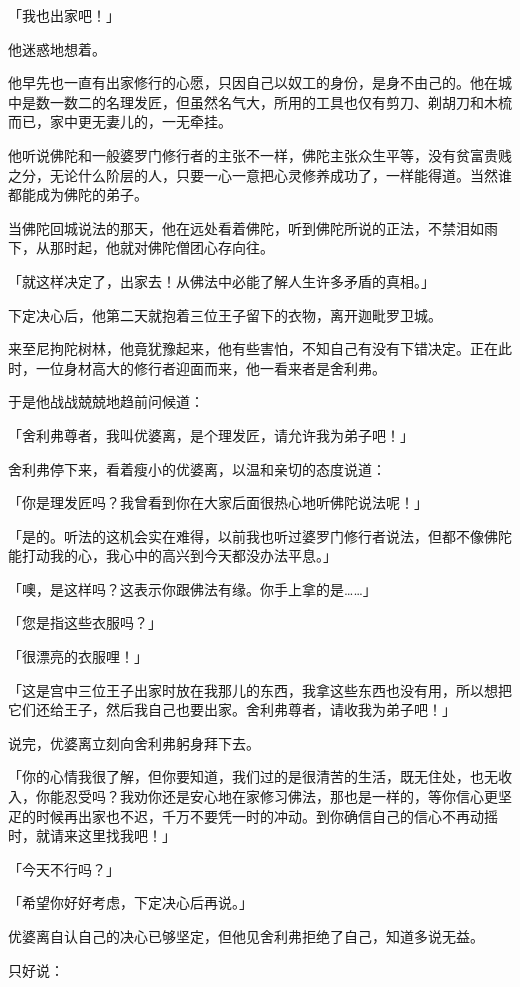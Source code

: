 \documentclass[twoside,openany]{book}
\begin{document}
「我也出家吧！」

他迷惑地想着。

他早先也一直有出家修行的心愿，只因自己以奴工的身份，是身不由己的。他在城中是数一数二的名理发匠，但虽然名气大，所用的工具也仅有剪刀、剃胡刀和木梳而已，家中更无妻儿的，一无牵挂。

他听说佛陀和一般婆罗门修行者的主张不一样，佛陀主张众生平等，没有贫富贵贱之分，无论什么阶层的人，只要一心一意把心灵修养成功了，一样能得道。当然谁都能成为佛陀的弟子。

当佛陀回城说法的那天，他在远处看着佛陀，听到佛陀所说的正法，不禁泪如雨下，从那时起，他就对佛陀僧团心存向往。

「就这样决定了，出家去！从佛法中必能了解人生许多矛盾的真相。」

下定决心后，他第二天就抱着三位王子留下的衣物，离开迦毗罗卫城。

来至尼拘陀树林，他竟犹豫起来，他有些害怕，不知自己有没有下错决定。正在此时，一位身材高大的修行者迎面而来，他一看来者是舍利弗。

于是他战战兢兢地趋前问候道：

「舍利弗尊者，我叫优婆离，是个理发匠，请允许我为弟子吧！」

舍利弗停下来，看着瘦小的优婆离，以温和亲切的态度说道：

「你是理发匠吗？我曾看到你在大家后面很热心地听佛陀说法呢！」

「是的。听法的这机会实在难得，以前我也听过婆罗门修行者说法，但都不像佛陀能打动我的心，我心中的高兴到今天都没办法平息。」

「噢，是这样吗？这表示你跟佛法有缘。你手上拿的是……」

「您是指这些衣服吗？」

「很漂亮的衣服哩！」

「这是宫中三位王子出家时放在我那儿的东西，我拿这些东西也没有用，所以想把它们还给王子，然后我自己也要出家。舍利弗尊者，请收我为弟子吧！」

说完，优婆离立刻向舍利弗躬身拜下去。

「你的心情我很了解，但你要知道，我们过的是很清苦的生活，既无住处，也无收入，你能忍受吗？我劝你还是安心地在家修习佛法，那也是一样的，等你信心更坚疋的时候再出家也不迟，千万不要凭一时的冲动。到你确信自己的信心不再动摇时，就请来这里找我吧！」

「今天不行吗？」

「希望你好好考虑，下定决心后再说。」

优婆离自认自己的决心已够坚定，但他见舍利弗拒绝了自己，知道多说无益。

只好说：
\end{document}
